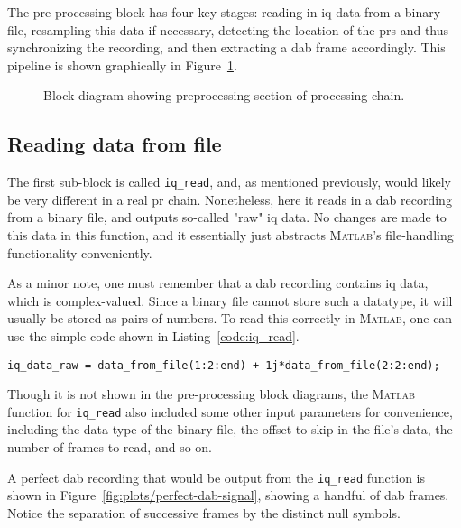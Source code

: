 \documentclass[class=report,11pt,crop=false]{standalone}
\begin{document}
The pre-processing block has four key stages: reading in \gls{iq} data from a binary file, resampling this data if necessary, detecting the location of the \gls{prs} and thus synchronizing the recording, and then extracting a \gls{dab} frame accordingly. This pipeline is shown graphically in Figure~\ref{fig:BD_Preprocess_All}.

\begin{figure}[htbp]
    \centering
    \captionsetup{type=figure}
    \def\svgwidth{\linewidth}
    { %
        }
    \caption{Block diagram showing preprocessing section of processing chain.}
    \label{fig:BD_Preprocess_All}
\end{figure}

\subsection{Reading  data from file \label{subsect:dab-proc_iq-read}}
The first sub-block is called \texttt{iq\_read}, and, as mentioned previously, would likely be very different in a real \gls{pr} chain. Nonetheless, here it reads in a \gls{dab} recording from a binary file, and outputs so-called "raw" \gls{iq} data. No changes are made to this data in this function, and it essentially just abstracts \textsc{Matlab}'s file-handling functionality conveniently.

As a minor note, one must remember that a \gls{dab} recording contains \gls{iq} data, which is complex-valued. Since a binary file cannot store such a datatype, it will usually be stored as pairs of numbers. To read this correctly in \textsc{Matlab}, one can use the simple code shown in Listing~\ref{code:iq_read}.

\begin{lstlisting}[caption={Creating a complex data array with the values read from a binary file},label={code:iq_read}]
iq_data_raw = data_from_file(1:2:end) + 1j*data_from_file(2:2:end);
\end{lstlisting}

Though it is not shown in the pre-processing block diagrams, the \textsc{Matlab} function for \texttt{iq\_read} also included some other input parameters for convenience, including the data-type of the binary file, the offset to skip in the file's data, the number of frames to read, and so on.

A perfect \gls{dab} recording that would be output from the \texttt{iq\_read} function is shown in Figure~\ref{fig:plots/perfect-dab-signal}, showing a handful of \gls{dab} frames. Notice the separation of successive frames by the distinct null symbols.
\end{document}

